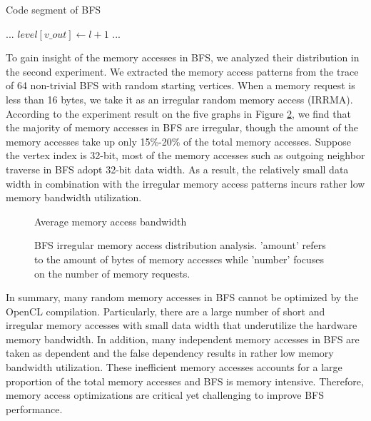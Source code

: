\vspace{-0.5em}
\begin{algorithm}
\footnotesize
	\caption{Code segment of BFS} \label{alg:code-seg}
	\begin{algorithmic}[2]
		\State ...
		\State $level[v\_out] \gets l + 1$
		\EndIf
		\EndFor
		\EndFor
		\State ...
	\end{algorithmic}
\end{algorithm}
\vspace{-0.5em}

To gain insight of the memory accesses in BFS, we analyzed their distribution in the second 
experiment. We extracted the memory access patterns from the trace of 64 non-trivial BFS 
with random starting vertices. When a memory request is less than 16 bytes, we take it as an irregular 
random memory access (IRRMA). According to the experiment result on the five graphs 
in Figure \ref{fig:bfs-mem-dist}, we find that the majority of memory accesses in BFS are irregular, 
though the amount of the memory accesses take up only 15\%-20\% of the total memory accesses. 
Suppose the vertex index is 32-bit, most of the memory accesses such as outgoing neighbor traverse 
in BFS adopt 32-bit data width. As a result, the relatively small data width in combination with the 
irregular memory access patterns incurs rather low memory bandwidth utilization. 
\begin{figure}
    \caption{Average memory access bandwidth}
\label{fig:avg-mem-lat}
\vspace{-0.5em}
\end{figure}

\begin{figure}
    \caption{BFS irregular memory access distribution analysis. 'amount' refers to the amount of 
	bytes of memory accesses while 'number' focuses on the number of memory requests.}
\label{fig:bfs-mem-dist}
\vspace{-1em}
\end{figure}

In summary, many random memory accesses in BFS cannot be optimized by the OpenCL compilation. 
Particularly, there are a large number of short and irregular memory
accesses with small data width that underutilize the hardware memory bandwidth. 
In addition, many independent memory accesses in BFS are taken as dependent and the 
false dependency results in rather low memory bandwidth utilization.
These inefficient memory accesses accounts for a large proportion of the total 
memory accesses and BFS is memory intensive. 
Therefore, memory access optimizations are critical yet challenging to improve BFS 
performance.
